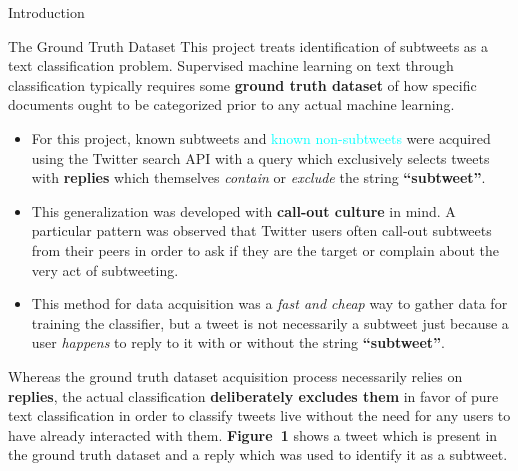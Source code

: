 \documentclass[12pt]{article}
\begin{document}
\begin{posterbard}
\begin{posterboxtitle}{Introduction}
\end{posterboxtitle}


\begin{posterboxtitle}{The Ground Truth Dataset}
This project treats identification of \textcolor{WildStrawberry}{subtweets} as a text classification problem. Supervised machine learning on text through classification typically requires some \textbf{ground truth dataset} of how specific documents ought to be categorized prior to any actual machine learning.

\begin{itemize}
\item For this project, \textcolor{WildStrawberry}{known subtweets} and \textcolor{Cyan}{known non-subtweets} were acquired using the Twitter search API with a query which exclusively selects tweets with \textbf{replies} which themselves \textit{contain} or \textit{exclude} the string \textbf{``subtweet''}.
\item This generalization was developed with \textbf{call-out culture} in mind. A particular pattern was observed that Twitter users often call-out subtweets from their peers in order to ask if they are the target or complain about the very act of subtweeting.
\item This method for data acquisition was a \textit{fast and cheap} way to gather data for training the classifier, but a tweet is not necessarily a \textcolor{WildStrawberry}{subtweet} just because a user \textit{happens} to reply to it with or without the string \textbf{``subtweet''}.
\end{itemize}

Whereas the ground truth dataset acquisition process necessarily relies on \textbf{replies}, the actual classification \textbf{deliberately excludes them} in favor of pure text classification in order to classify tweets live without the need for any users to have already interacted with them. \textbf{Figure~1} shows a tweet which is present in the ground truth dataset and a reply which was used to identify it as a \textcolor{WildStrawberry}{subtweet}.

\end{posterboxtitle}



\end{posterbard}
\end{document}

